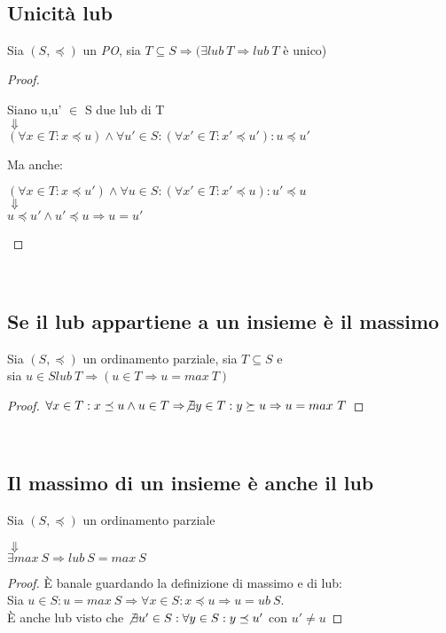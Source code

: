 \documentclass[a4paper, 10pt]{article} %
\begin{document}
\
\subsection{Unicità lub}
\begin{esercizio}
  Sia $(S, \preceq)$ un \emph{PO}, sia $T \subseteq S \Rightarrow (\exists lub\ T \Rightarrow lub\ T$ è unico)
\end{esercizio}
\begin{proof}
  \begin{center}
    Siano u,u' $\in$ S due lub di T\\
    $\Downarrow$\\
    $(\forall x \in T : x \preceq u) \land \forall u' \in S :
    (\forall x' \in T : x' \preceq u') : u \preceq u'$
  \end{center}
  Ma anche:
  \begin{center}
    $(\forall x \in T : x \preceq u') \land \forall u \in S :
    (\forall x' \in T : x' \preceq u) : u' \preceq u$\\
    $\Downarrow$\\
    $u \preceq u' \land u' \preceq u \Rightarrow u = u'$
  \end{center}
\end{proof}

\
\subsection{Se il lub appartiene a un insieme è il massimo}
\begin{esercizio}[$lub\ T \in T \Rightarrow lub\ T = max\ T$]
  Sia $(S, \preceq)$ un ordinamento parziale, sia $T \subseteq S$ e\\
  sia $u \in S lub\ T \Rightarrow (u \in T \Rightarrow u = max\ T)$
  \begin{proof}
    $\forall x \in T : x \preceq u \land u \in T \Rightarrow \not \exists y \in T : y \succeq u \Rightarrow u = max\ T$
  \end{proof}
\end{esercizio}

\
\subsection{Il massimo di un insieme è anche il lub}
\begin{esercizio}[$\exists max\ S \Rightarrow lub\ S = max\ S$]
  Sia $(S, \preceq)$ un ordinamento parziale
  \begin{center}
    $\Downarrow$\\
    $\exists max\ S \Rightarrow lub\ S = max\ S$
  \end{center}
  \begin{proof}
    È banale guardando la definizione di massimo e di lub:\\
    Sia $u \in S : u = max\ S \Rightarrow \forall x \in S : x \preceq u \Rightarrow u = ub\ S$.\\
    È anche lub visto che $\not \exists u' \in S : \forall y \in S : y \preceq u'$ con $ u' \neq u$
  \end{proof}
\end{esercizio}
\end{document}
